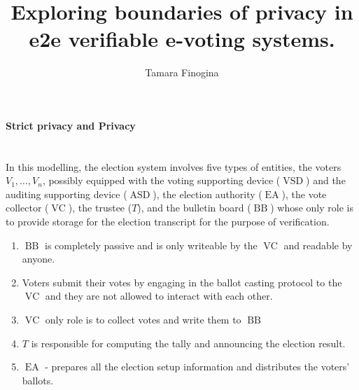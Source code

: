 \documentclass[12pt]{article}
\author{Tamara Finogina}
\title{Exploring boundaries of privacy in e2e verifiable e-voting systems.}
\date{}
\DeclareMathOperator{\vsd}{VSD}
\DeclareMathOperator{\asd}{ASD}
\DeclareMathOperator{\ea}{EA}
\DeclareMathOperator{\bb}{BB}
\DeclareMathOperator{\voc}{VC}
\begin{document}
\maketitle
{\textbf{\huge{Strict privacy and Privacy}}}\\\\\\
In this modelling, the election system involves five types of entities, the voters $V_1, \dots , V_n$, possibly equipped with the voting supporting device ($\vsd$) and the auditing supporting device ($\asd$), the election authority ($\ea$), the vote collector ($\voc$), the trustee ($T$), and the bulletin board ($\bb$) whose only role is to provide storage for the election transcript for the purpose of verification. 
\begin{enumerate}
\item $\bb$ is completely passive and is only writeable by the $\voc$ and readable by anyone. 
\item Voters submit their votes by engaging in the ballot casting protocol to the $\voc$ and they are not allowed to interact with each other. 
\item $\voc$ only role is to collect votes and write them to $\bb$
\item $T$ is responsible for computing the tally and announcing the election result.
\item $\ea$ - prepares all the election setup information and distributes the voters' ballots.
\end{enumerate}
\end{document}
